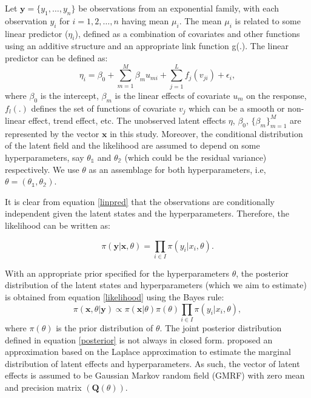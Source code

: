 \documentclass[
]{article}
\begin{document}
Let \(\mathbf{y} = \{y_1, \ldots, y_n\}\) be observations from an
exponential family, with each observation \(y_i\) for
\(i = 1, 2, \ldots, n\) having mean \(\mu_i\). The mean \(\mu_i\) is
related to some linear predictor (\(\eta_i\)), defined as a combination
of covariates and other functions using an additive structure and an
appropriate link function g(.). The linear predictor can be defined as:
\begin{equation}\label{linpred}
\eta_i = \beta_0 + \sum_{m = 1}^M \beta_m u_{mi} + \sum_{j = 1}^L f_{j}(v_{ji}) + \epsilon_i,
\end{equation} where \(\beta_0\) is the intercept, \(\beta_m\) is the
linear effects of covariate \(u_m\) on the response, \(f_l(.)\) defines
the set of functions of covariate \(v_j\) which can be a smooth or
non-linear effect, trend effect, etc. The unobserved latent effects
\(\eta\), \(\beta_0\), \(\{\beta_m\}_{m=1}^{M}\) are represented by the
vector \(\mathbf{x}\) in this study. Moreover, the conditional
distribution of the latent field and the likelihood are assumed to
depend on some hyperparameters, say \(\mathbb{\theta_1}\) and
\(\mathbb{\theta_2}\) (which could be the residual variance)
respectively. We use \(\mathbb{\theta}\) as an assemblage for both
hyperparameters, i.e,
\(\mathbb{\theta} = (\mathbb{\theta_1}, \mathbb{\theta_2})\).

It is clear from equation \eqref{linpred} that the observations are
conditionally independent given the latent states and the
hyperparameters. Therefore, the likelihood can be written as:

\begin{equation}\label{likelihood}
\pi(\mathbf{y}|\mathbf{x}, \mathbb{\theta} ) = \prod_{i\in I} \pi(y_i | x_i, \mathbb{\theta}).
\end{equation}

With an appropriate prior specified for the hyperparameters
\(\mathbb{\theta}\), the posterior distribution of the latent states and
hyperparameters (which we aim to estimate) is obtained from equation
\eqref{likelihood} using the Bayes rule:
\begin{equation}\label{posterior}
\pi(\mathbf{x}, \mathbb{\theta} | \mathbf{y}) \propto \pi(\mathbf{x}|\mathbb{\theta}) \pi(\mathbb{\theta}) \prod_{i\in I} \pi(y_i | x_i, \mathbb{\theta}),
\end{equation} where \(\pi(\mathbb{\theta})\) is the prior distribution
of \(\mathbb{\theta}\). The joint posterior distribution defined in
equation \eqref{posterior} is not always in closed form.
\citet{rue2009approximate} proposed an approximation based on the
Laplace approximation to estimate the marginal distribution of latent
effects and hyperparameters. As such, the vector of latent effects is
assumed to be Gaussian Markov random field (GMRF) with zero mean and
precision matrix \((\mathbf{Q(\mathbb \theta)})\).
\end{document}
